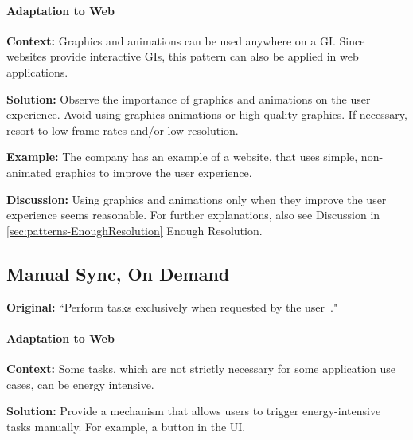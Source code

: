 \paragraph{Adaptation to Web}\mbox{}

\textbf{Context:} Graphics and animations can be used anywhere on a GI. Since websites provide interactive GIs, this pattern can also be applied in web applications.

\textbf{Solution:} Observe the importance of graphics and animations on the user experience. Avoid using graphics animations or high-quality graphics. If necessary, resort to low frame rates and/or low resolution.

\textbf{Example:} The company has an example of a website, that uses simple, non-animated graphics to improve the user experience.

 

\textbf{Discussion:} Using graphics and animations only when they improve the user experience seems reasonable. For further explanations, also see Discussion in \ref{sec:patterns-EnoughResolution} Enough Resolution.


\subsection{Manual Sync, On Demand} \label{sec:patterns-ManualSyncOnDemand}
\textbf{Original:} ``Perform tasks exclusively when requested by the user~\cite{cruz2019catalog}."

\paragraph{Adaptation to Web}\mbox{}

\textbf{Context:} Some tasks, which are not strictly necessary for some application use cases, can be energy intensive.

\textbf{Solution:} Provide a mechanism that allows users to trigger energy-intensive tasks manually. For example, a button in the UI.

